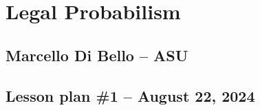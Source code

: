 \documentclass[16pt]{article}
\begin{document}

\thispagestyle{empty}

\vspace{-2cm}
\noindent
\section*{\Large Legal Probabilism} 
\subsection*{Marcello Di Bello -- ASU}
\subsection*{Lesson plan \#1 -- August 22, 2024}

\vspace{5mm}
\end{document}
